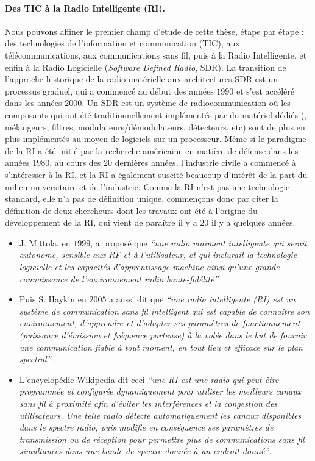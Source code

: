 \begin{resume_fr}
\paragraph{Des TIC à la Radio Intelligente (RI).}
%
Nous pouvons affiner le premier champ d'étude de cette thèse, étape par étape :
des technologies de l'information et communication (TIC), aux télécommunications, aux communications sans fil, puis à la Radio Intelligente,
et enfin à la Radio Logicielle (\emph{Software Defined Radio}, SDR).
%
La transition de l'approche historique de la radio matérielle aux architectures SDR est un processus graduel, qui a commencé au début des années $1990$ et s'est accéléré dans les années $2000$.
Un SDR est un système de radiocommunication où les composants qui ont été traditionnellement implémentés par du matériel dédiés (\eg, mélangeurs, filtres, modulateurs/démodulateurs, détecteurs, etc) sont de plus en plus implémentés au moyen de logiciels sur un processeur.
%
Même si le paradigme de la RI a été initié par la recherche américaine en matière de défense dans les années $1980$, au cours des $20$ dernières années, l'industrie civile a commencé à s'intéresser à la RI, et la RI a également suscité beaucoup d'intérêt de la part du milieu universitaire et de l'industrie.
%
Comme la RI n'est pas une technologie standard, elle n'a pas de définition unique, commençons donc par citer la définition de deux chercheurs dont les travaux ont été à l'origine du développement de la RI, qui vient de paraître il y a $20$ il y a quelques années.
%
\begin{itemize}
    \item
    J. Mittola, en $1999$, a proposé que
    \emph{``une radio vraiment intelligente qui serait autonome, sensible aux RF et à l'utilisateur, et qui inclurait la technologie logicielle et les capacités d'apprentissage machine ainsi qu'une grande connaissance de l'environnement radio haute-fidélité''} \cite{Mitola99}.

    \item
    Puis S. Haykin en $2005$ a aussi dit que
    \emph{``une radio intelligente (RI) est un système de communication sans fil intelligent qui est capable de connaître son environnement, d'apprendre et d'adapter ses paramètres de fonctionnement (puissance d'émission et fréquence porteuse) à la volée dans le but de fournir une communication fiable à tout moment, en tout lieu et efficace sur le plan spectral''} \cite{Haykin05}.

    \item
    L'\href{https://en.wikipedia.org/wiki/Cognitive_radio}{encyclopédie Wikipedia} dit ceci
    \emph{``une RI est une radio qui peut être programmée et configurée dynamiquement pour utiliser les meilleurs canaux sans fil à proximité afin d'éviter les interférences et la congestion des utilisateurs. Une telle radio détecte automatiquement les canaux disponibles dans le spectre radio, puis modifie en conséquence ses paramètres de transmission ou de réception pour permettre plus de communications sans fil simultanées dans une bande de spectre donnée à un endroit donné''}.
\end{itemize}


\end{resume_fr}

